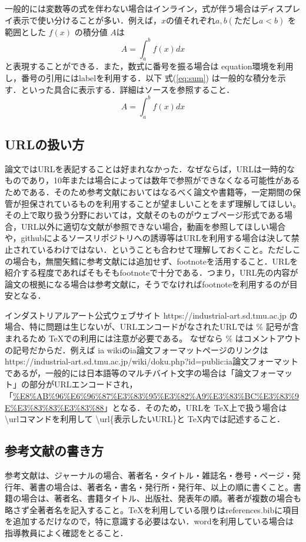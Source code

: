 \documentclass[uplatex,dvipdfmx,a4paper]{jsarticle}
\begin{document}
一般的には変数等の式を伴わない場合はインライン，式が伴う場合はディスプレイ表示で使い分けることが多い．例えば，$x$の値それぞれ$ a, b(ただしa < b)$ を範囲とした $f(x)$ の積分値 $ A $は
$$
A = \int^{b}_{a} f(x) dx
$$
と表現することができる．また，数式に番号を振る場合は equation環境を利用し，番号の引用にはlabelを利用する．以下 式(\ref{eq:sum}) は一般的な積分を示す．といった具合に表示する．詳細はソースを参照すること．
\begin{equation}
A = \int^{b}_{a} f(x) dx
\label{eq:sum}
\end{equation}

\subsection{URLの扱い方}
論文ではURLを表記することは好まれなかった．なぜならば，URLは一時的なものであり，10年または場合によっては数年で参照ができなくなる可能性があるためである．そのため参考文献においてはなるべく論文や書籍等，一定期間の保管が担保されているものを利用することが望ましいことをまず理解してほしい。その上で取り扱う分野においては，文献そのものがウェブページ形式である場合，URL以外に適切な文献が参照できない場合，動画を参照してほしい場合や，githubによるソースリポジトリへの誘導等はURLを利用する場合は決して禁止されているわけではない．ということも合わせて理解しておくこと。ただしこの場合も，無闇矢鱈に参考文献には追加せず、footnoteを活用すること．URLを紹介する程度であればそもそもfootnoteで十分である．つまり，URL先の内容が論文の根拠になる場合は参考文献に，そうでなければfootnoteを利用するのが目安となる．

インダストリアルアート公式ウェブサイト https://industrial-art.sd.tmu.ac.jp の場合、特に問題は生じないが、URLエンコードがなされたURLでは \% 記号が含まれるため \TeX での利用には注意が必要である。 なぜなら \% はコメントアウトの記号だからだ．例えば ia wikiのia論文フォーマットページのリンクは {https://industrial-art.sd.tmu.ac.jp/wiki/doku.php?id=public:ia論文フォーマット} であるが，一般的には日本語等のマルチバイト文字の場合は「論文フォーマット」の部分がURLエンコードされ，「\url{%E8%AB%96%E6%96%87%E3%83%95%E3%82%A9%E3%83%BC%E3%83%9E%E3%83%83%E3%83%88}」となる．そのため，URLを \TeX 上で扱う場合は \textbackslash{url}コマンドを利用して \textbackslash{url\{表示したいURL\}}と \TeX 内では記述すること．

\subsection{参考文献の書き方}
参考文献は、ジャーナルの場合、著者名・タイトル・雑誌名・巻号・ページ・発行年、著書の場合は、著者名・書名・発行所・発行年、以上の順に書くこと。書籍の場合は、著者名、書籍タイトル、出版社、発表年の順。著者が複数の場合も略さず全著者名を記入すること。\TeX を利用している限りはreferences.bibに項目を追加するだけなので，特に意識する必要はない．wordを利用している場合は指導教員によく確認をとること．
\end{document}
